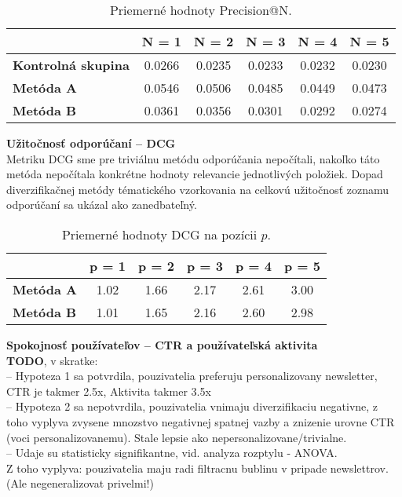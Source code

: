 \begin{table}[H]
\centering
\caption{Priemerné hodnoty Precision@N.}
\label{tab:pan}
\begin{tabular}{|l|c|c|c|c|c|}
\hline
                           & \textbf{N = 1} & \textbf{N = 2} & \textbf{N = 3} & \textbf{N = 4} & \textbf{N = 5} \\ \hline
\textbf{Kontrolná skupina} & 0.0266         & 0.0235         & 0.0233         & 0.0232         & 0.0230         \\ \hline
\rowcolor[HTML]{32CB00}
\textbf{Metóda A}          & 0.0546         & 0.0506         & 0.0485         & 0.0449         & 0.0473         \\ \hline
\textbf{Metóda B}          & 0.0361         & 0.0356         & 0.0301         & 0.0292         & 0.0274         \\ \hline
\end{tabular}
\end{table}


\textbf{Užitočnosť odporúčaní -- DCG}\\
Metriku DCG sme pre triviálnu metódu odporúčania nepočítali, nakoľko táto metóda nepočítala konkrétne hodnoty relevancie
jednotlivých položiek. Dopad diverzifikačnej metódy tématického vzorkovania na celkovú užitočnosť zoznamu odporúčaní sa ukázal
ako zanedbateľný.

\begin{table}[H]
\centering
\caption{Priemerné hodnoty DCG na pozícii $p$.}
\label{tab:dcgn}
\begin{tabular}{|l|c|c|c|c|c|}
\hline
                  & \textbf{p = 1} & \textbf{p = 2} & \textbf{p = 3} & \textbf{p = 4} & \textbf{p = 5} \\ \hline
\rowcolor[HTML]{32CB00}
\textbf{Metóda A} & 1.02           & 1.66           & 2.17           & 2.61           & 3.00           \\ \hline
\textbf{Metóda B} & 1.01           & 1.65           & 2.16           & 2.60           & 2.98           \\ \hline
\end{tabular}
\end{table}


\textbf{Spokojnosť používateľov -- CTR a používateľská aktivita}\\
\textbf{TODO}, v skratke:\\
-- Hypoteza 1 sa potvrdila, pouzivatelia preferuju personalizovany newsletter, CTR je takmer 2.5x, Aktivita takmer 3.5x\\
-- Hypoteza 2 sa nepotvrdila, pouzivatelia vnimaju diverzifikaciu negativne, z toho vyplyva zvysene mnozstvo negativnej spatnej vazby
a znizenie urovne CTR (voci personalizovanemu). Stale lepsie ako nepersonalizovane/trivialne.\\
-- Udaje su statisticky signifikantne, vid. analyza rozptylu - ANOVA.\\
Z toho vyplyva: pouzivatelia maju radi filtracnu bublinu v pripade newslettrov. (Ale negeneralizovat privelmi!)

